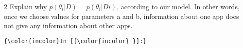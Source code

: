 \documentclass[11pt]{article}
\begin{document}
    2 Explain why \(p(\theta_i| D) = p(\theta_i| Di)\), according to our
model. In other words, once we choose values for parameters a and b,
information about one app does not give any information about other
apps.

    \begin{Verbatim}[commandchars=\\\{\}]
{\color{incolor}In [{\color{incolor} }]:} 
\end{Verbatim}


    
    
    
    
\end{document}
